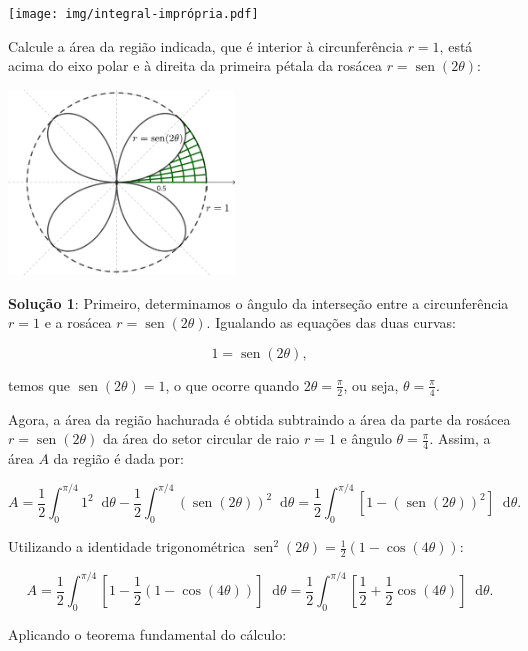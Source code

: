 \documentclass[12pt,a4paper]{article}
\newcommand*\diff{\mathop{}\!\mathrm{d}}
\newcommand*\sen{\operatorname{sen}}
\begin{document}
\begin{ExerciseList}
\begin{center}
  \texttt{[image: img/integral-imprópria.pdf]}
\end{center}



\Exercise[title={2,5}] Calcule a área da região indicada, que é interior à circunferência \(r = 1\), está acima do eixo polar e à direita da primeira pétala da rosácea \(r = \sen(2\theta)\):

\begin{center}
  \includegraphics[width=6.0cm]{img/curvas-polares.pdf}
\end{center}

\Answer \textbf{Solução 1}: Primeiro, determinamos o ângulo da interseção entre a circunferência \(r = 1\) e a rosácea \(r = \sen(2\theta)\). Igualando as equações das duas curvas:

\[
1 = \sen(2\theta),
\]

temos que \(\sen(2\theta) = 1\), o que ocorre quando \(2\theta = \frac{\pi}{2}\), ou seja, \(\theta = \frac{\pi}{4}\).

Agora, a área da região hachurada é obtida subtraindo a área da parte da rosácea \(r = \sen(2\theta)\) da área do setor circular de raio \(r = 1\) e ângulo \(\theta = \frac{\pi}{4}\). Assim, a área \(A\) da região é dada por:

\[
A
= \frac{1}{2}\int_0^{\pi/4} 1^2 \diff\theta - \frac{1}{2}\int_0^{\pi/4} \left(\sen(2\theta)\right)^2 \diff\theta
= \frac{1}{2} \int_0^{\pi/4} \left[1 - \left(\sen(2\theta)\right)^2 \right] \diff\theta.
\]

Utilizando a identidade trigonométrica \(\sen^2(2\theta) = \frac{1}{2}\left(1 - \cos(4\theta)\right)\):

\[
A = \frac{1}{2} \int_0^{\pi/4} \left[1 - \frac{1}{2}\left(1 - \cos(4\theta)\right)\right] \diff\theta = \frac{1}{2} \int_0^{\pi/4} \left[\frac{1}{2} + \frac{1}{2}\cos(4\theta)\right] \diff\theta.
\]

Aplicando o teorema fundamental do cálculo:


\end{ExerciseList}
\end{document}
